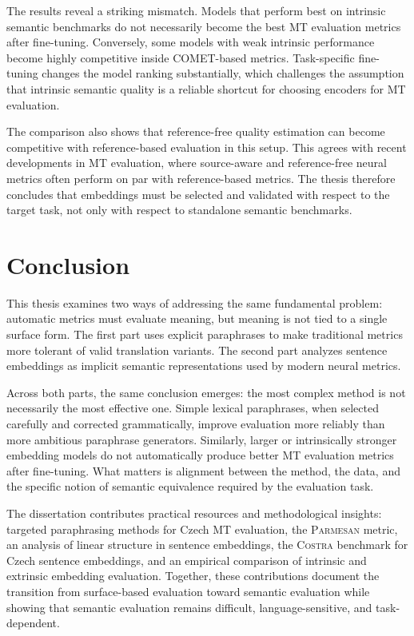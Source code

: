 \documentclass[12pt,a4paper]{report}
\newcommand{\comet}{\textsc{COMET}\xspace}
\newcommand{\parmesan}{\textsc{Parmesan}\xspace}
\newcommand{\costra}{\textsc{Costra}\xspace}
\newcommand{\chapwithtoc}[1]{\chapter*{#1}\addcontentsline{toc}{chapter}{#1}}
\begin{document}
The results reveal a striking mismatch. Models that perform best on intrinsic semantic 
benchmarks do not necessarily become the best MT evaluation metrics after fine-tuning. 
Conversely, some models with weak intrinsic performance become highly competitive 
inside \comet-based metrics. Task-specific fine-tuning changes the model ranking 
substantially, which challenges the assumption that intrinsic semantic quality is a 
reliable shortcut for choosing encoders for MT evaluation.

The comparison also shows that reference-free quality estimation can become competitive 
with reference-based evaluation in this setup. This agrees with recent developments in
MT evaluation, where source-aware and reference-free neural metrics often perform on par 
with reference-based metrics. The thesis therefore concludes that embeddings must be selected 
and validated with respect to the target task, not only with respect to standalone semantic 
benchmarks.

\chapwithtoc{Conclusion}

This thesis examines two ways of addressing the same fundamental problem: automatic 
metrics must evaluate meaning, but meaning is not tied to a single surface form. The 
first part uses explicit paraphrases to make traditional metrics more tolerant of valid 
translation variants. The second part analyzes sentence embeddings as implicit semantic 
representations used by modern neural metrics.

Across both parts, the same conclusion emerges: the most complex method is not necessarily 
the most effective one. Simple lexical paraphrases, when selected carefully and corrected 
grammatically, improve evaluation more reliably than more ambitious paraphrase generators. 
Similarly, larger or intrinsically stronger embedding models do not automatically produce 
better MT evaluation metrics after fine-tuning. What matters is alignment between the method, 
the data, and the specific notion of semantic equivalence required by the evaluation task.

The dissertation contributes practical resources and methodological insights: targeted 
paraphrasing methods for Czech MT evaluation, the \parmesan metric, an analysis of linear 
structure in sentence embeddings, the \costra benchmark for Czech sentence embeddings, 
and an empirical comparison of intrinsic and extrinsic embedding evaluation. Together, 
these contributions document the transition from surface-based evaluation toward semantic 
evaluation while showing that semantic evaluation remains difficult, language-sensitive, 
and task-dependent.
\end{document}

